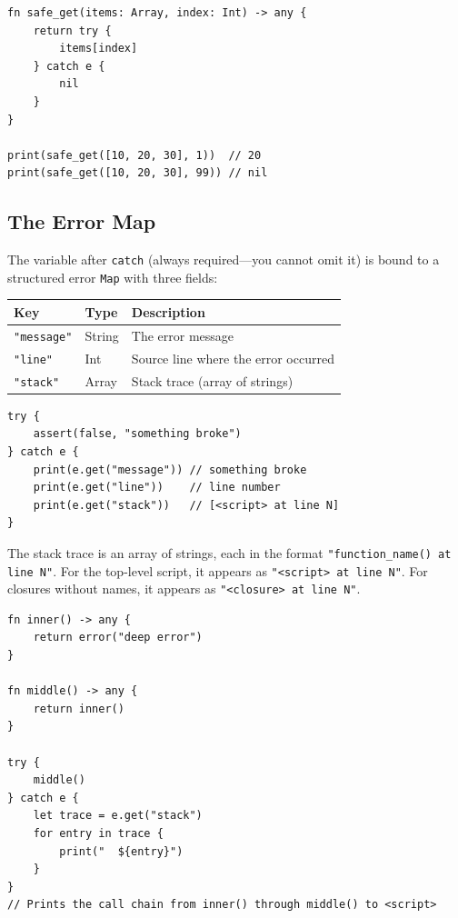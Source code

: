 \begin{lstlisting}[language=Lattice, caption={try/catch produces a value}]
fn safe_get(items: Array, index: Int) -> any {
    return try {
        items[index]
    } catch e {
        nil
    }
}

print(safe_get([10, 20, 30], 1))  // 20
print(safe_get([10, 20, 30], 99)) // nil
\end{lstlisting}

\subsection{The Error Map}\label{sec:error-map}

The variable after \lstinline|catch| (always required---you cannot omit it) is bound to a structured error \lstinline|Map| with three fields:

\begin{center}
\begin{tabular}{lll}
\toprule
\textbf{Key} & \textbf{Type} & \textbf{Description} \\
\midrule
\lstinline|"message"| & String & The error message \\
\lstinline|"line"| & Int & Source line where the error occurred \\
\lstinline|"stack"| & Array & Stack trace (array of strings) \\
\bottomrule
\end{tabular}
\end{center}

\begin{lstlisting}[language=Lattice, caption={Inspecting the error map}]
try {
    assert(false, "something broke")
} catch e {
    print(e.get("message")) // something broke
    print(e.get("line"))    // line number
    print(e.get("stack"))   // [<script> at line N]
}
\end{lstlisting}

The stack trace is an array of strings, each in the format \lstinline|"function_name() at line N"|. For the top-level script, it appears as \lstinline|"<script> at line N"|. For closures without names, it appears as \lstinline|"<closure> at line N"|.

\begin{lstlisting}[language=Lattice, caption={Reading the stack trace}]
fn inner() -> any {
    return error("deep error")
}

fn middle() -> any {
    return inner()
}

try {
    middle()
} catch e {
    let trace = e.get("stack")
    for entry in trace {
        print("  ${entry}")
    }
}
// Prints the call chain from inner() through middle() to <script>
\end{lstlisting}

